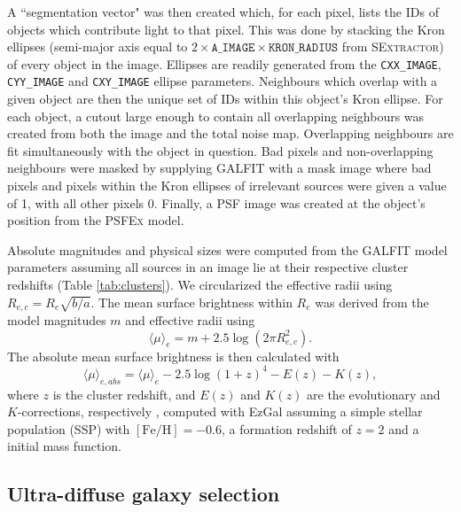 \documentclass[iop,tighten,twocolumn,apj,floatfix]{emulateapj}
\begin{document}
A ``segmentation vector" was then created which, for each pixel, lists the IDs
of objects which contribute light to that pixel. This was done by stacking the
Kron ellipses (semi-major axis equal to $2 \times \mathtt{A\_IMAGE} \times
\mathtt{KRON\_RADIUS}$ from \textsc{SExtractor}) of every object in the image.
Ellipses are readily generated from the \texttt{CXX\_IMAGE},
\texttt{CYY\_IMAGE} and \texttt{CXY\_IMAGE} ellipse parameters. Neighbours
which overlap with a given object are then the unique set of IDs within this
object's Kron ellipse.  For each object, a cutout large enough to contain all
overlapping neighbours was created from both the image and the total noise
map.  Overlapping neighbours are fit simultaneously with the object in
question.  Bad pixels and non-overlapping neighbours were masked by supplying
GALFIT with a mask image where bad pixels and pixels within the Kron ellipses
of irrelevant sources were given a value of 1, with all other pixels 0.
Finally, a PSF image was created at the object's position from the \textsc{PSFEx}
model.

Absolute magnitudes and physical sizes were computed from the GALFIT model
parameters assuming all sources in an image lie at their respective cluster
redshifts (Table \ref{tab:clusters}).  We circularized the effective radii
using $R_{e,c} = R_e\sqrt{b/a}$. The mean surface brightness within $R_e$ was
derived from the model magnitudes $m$ and effective radii using 
\begin{equation}
    \langle\mu\rangle_{e} = m + 2.5\log(2 \pi R_{e,c}^2).
\end{equation}
The absolute mean surface brightness is then calculated with
\begin{equation}
    \langle\mu\rangle_{e,abs} = \langle\mu\rangle_{e} -
    2.5\log(1+z)^4 - E(z) - K(z),
\end{equation}
where $z$ is the cluster redshift, and $E(z)$ and $K(z)$ are the evolutionary
and $K$-corrections, respectively \citep{graham2005}, computed with EzGal
\citep{ezgal} assuming a simple stellar population (SSP) with
$[\mathrm{Fe}/\mathrm{H}] = -0.6$, a formation redshift of $z=2$ and a
\cite{chabrier2003} initial mass function.

\subsection{Ultra-diffuse galaxy selection}\label{sec:udgselection}
\end{document}
